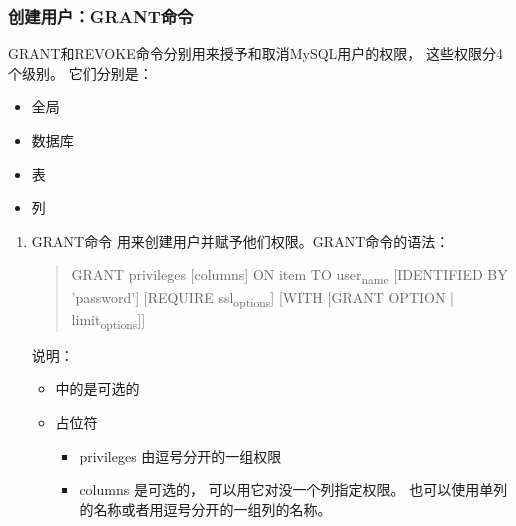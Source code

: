 \documentclass[11pt]{article}
\begin{document}
\subsubsection{创建用户：GRANT命令}
\label{sec:orge0ef74d}
GRANT和REVOKE命令分别用来授予和取消MySQL用户的权限， 这些权限分4个级别。  它们分别是：
\begin{itemize}
\item 全局
\item 数据库
\item 表
\item 列
\end{itemize}
\begin{enumerate}
\item GRANT命令
\label{sec:orga68c773}
用来创建用户并赋予他们权限。GRANT命令的语法：
\begin{quote}
GRANT privileges [columns]
ON item 
TO user\textsubscript{name} [IDENTIFIED BY 'password']
[REQUIRE ssl\textsubscript{options}]
[WITH [GRANT OPTION | limit\textsubscript{options}]]
\end{quote}
说明：
\begin{itemize}
\item\relax []中的是可选的
\item 占位符
\begin{itemize}
\item privileges   由逗号分开的一组权限
\item columns  是可选的， 可以用它对没一个列指定权限。  也可以使用单列的名称或者用逗号分开的一组列的名称。
\end{itemize}
\end{itemize}
\end{enumerate}
\end{document}
